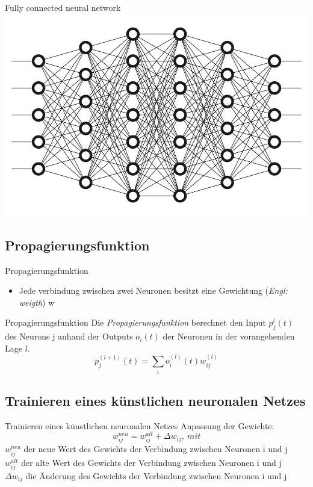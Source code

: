 \documentclass[18pt]{beamer}
\begin{document}
\begin{frame}{Fully connected neural network}
\includegraphics[scale=0.4]{images/DeepNeuralNetwork.jpg}
\cite{Raicea2018Jun}
\end{frame}

\subsection{Propagierungsfunktion}

\begin{frame}{Propagierungsfunktion}
\begin{itemize}
\item{Jede verbindung zwischen zwei Neuronen besitzt eine Gewichtung (\textit{Engl: weigth}) w}
\end{itemize}
\end{frame}

\begin{frame}{Propagierungsfunktion}
Die \textit{Propagierungsfunktion} berechnet den Input $p_j^{l}(t)$ des Neurons j anhand der Outputs $o_i(t)$ der Neuronen in der vorangehenden Lage $l$.
\begin{equation}
p_j^{(l+1)}(t) = \sum_{i}^{} o_i^{(l)}(t) w_{ij}^{(l)}
\end{equation}
\end{frame}

\subsection{Trainieren eines künstlichen neuronalen Netzes}

\begin{frame}{Trainieren eines künstlichen neuronalen Netzes}
Anpassung der Gewichte:
\begin{equation}
w_{ij}^{neu} = w_{ij}^{alt} + \Delta w_{ij},\ mit
\end{equation}
$w_{ij}^{neu}$ der neue Wert des Gewichts der Verbindung zwischen Neuronen i und j\\
$w_{ij}^{alt}$ der alte Wert des Gewichts	der Verbindung zwischen Neuronen i und j	\\
$\Delta w_{ij}$ die Änderung des Gewichts der Verbindung zwischen Neuronen i und j
\end{frame}
\end{document}
